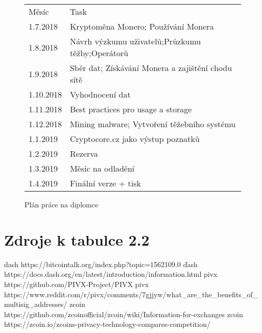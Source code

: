 \documentclass[
  printed, %
  table,   %
  nolof,     %
  nolot,     %
           oneside, color
]{fithesis3}
\begin{document}
\begin{figure}[H]
\center
\begin{tabular}{ll}
Měsíc     & Task                                              \\
1.7.2018  & Kryptoměna Monero; Používání Monera               \\
1.8.2018  & Návrh výzkumu uživatelů;Průzkumu těžby;Operátorů  \\
1.9.2018  & Sběr dat; Získávání Monera a zajištění chodu sítě \\
1.10.2018 & Vyhodnocení dat                                   \\
1.11.2018 & Best practices pro usage a storage                \\
1.12.2018 & Mining malware; Vytvoření těžebního systému       \\
1.1.2019  & Cryptocore.cz jako výstup poznatků                \\
1.2.2019  & Rezerva                                           \\
1.3.2019  & Měsíc na odladění                                 \\
1.4.2019  & Finální verze + tisk                             
\end{tabular}
\caption{Plán práce na diplomce}
\label{ssme-thesis-plan}
\end{figure}



\printbibliography[heading=bibintoc]

\appendix %
\chapter{Zdroje k tabulce 2.2}
dash https://bitcointalk.org/index.php?topic=1562109.0
ďash https://docs.dash.org/en/latest/introduction/information.html
pivx https://github.com/PIVX-Project/PIVX
pivx https://www.reddit.com/r/pivx/comments/7gjjyw/what_are_the_benefits_of_multisig_addresses/
zcoin https://github.com/zcoinofficial/zcoin/wiki/Information-for-exchanges
zcoin https://zcoin.io/zcoins-privacy-technology-compares-competition/
\end{document}

